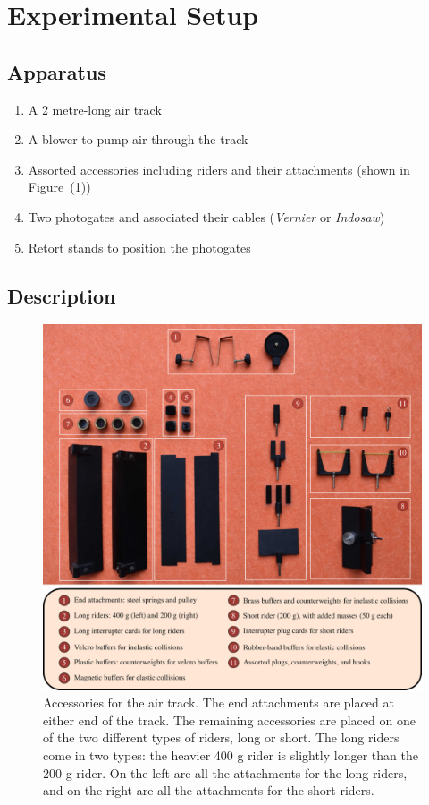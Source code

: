 \section*{Experimental Setup}

\subsection*{Apparatus}

\begin{enumerate}
\itemsep0em
\item A 2 metre-long air track
\item A blower to pump air through the track
\item Assorted accessories including riders and their attachments (shown in Figure~(\ref{fig:airtrack-accessories}))
\item Two photogates and associated their cables (\textsl{Vernier} or \textsl{Indosaw})
\item Retort stands to position the photogates
\end{enumerate}


\subsection*{Description}

\begin{figure}[!htb]
    \centering
    \includegraphics[width=\textwidth]{figs/airtrack/airtrack-accessories.jpg}
    \caption{Accessories for the air track. The end attachments are placed at either end of the track. The remaining accessories are placed on one of the two different types of riders, long or short. The long riders come in two types: the heavier 400 g rider is slightly longer than the 200 g rider. On the left are all the attachments for the long riders, and on the right are all the attachments for the short riders.}
    \label{fig:airtrack-accessories}
\end{figure}

